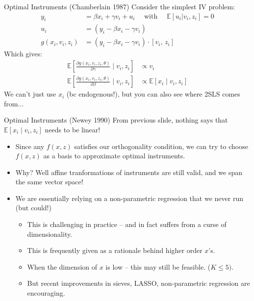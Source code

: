 \begin{frame}{Optimal Instruments (Chamberlain 1987)}
Consider the simplest IV problem:
\begin{align*}
y_i &= \beta x_i + \gamma v_i + u_i \quad \text{ with } \quad \mathbb{E}[u_i | v_i, z_i] =0 \\
u_i &= \left(y_i - \beta x_i - \gamma v_i \right) \\
g(x_i,v_i,z_i) &= \left(y_i - \beta x_i - \gamma v_i \right) \cdot [v_i,\, z_i]
 \end{align*}
 Which gives:
\begin{align*}
\mathbb{E}\left[\frac{\partial g(x_i,v_i, z_i,\theta)}{\partial \gamma} \mid v_i, z_i \right] &\propto v_i\\
\mathbb{E}\left[\frac{\partial g(x_i,v_i, z_i,\theta)}{\partial \beta} \mid v_i, z_i \right] &
\propto \mathbb{E}\left[x_i \mid v_i, z_i \right]
\end{align*}
We can't just use $x_i$ (bc endogenous!), but you can also see where 2SLS comes from...
\end{frame}




\begin{frame}{Optimal Instruments (Newey 1990)}
From previous slide, nothing says that $\mathbb{E}\left[x_i \mid v_i, z_i \right]$ needs to be \alert{linear}!
\begin{itemize}
\item Since any $f(x,z)$ satisfies our orthogonality condition, we can try to choose $f(x,z)$ as a \alert{basis} to approximate optimal instruments.
\item Why? Well affine tranformations of instruments are still valid, and we span the same vector space!
\item We are essentially relying on a non-parametric regression that we never run (but could!)
\begin{itemize}
\item This is challenging in practice -- and in fact suffers from a curse of dimensionality.
\item This is frequently given as a rationale behind higher order $x$'s.
\item When the dimension of $x$ is low -- this may still be feasible. ($K \leq 5)$.
\item But recent improvements in sieves, LASSO, non-parametric regression are encouraging.
\end{itemize}
\end{itemize}
\end{frame}



